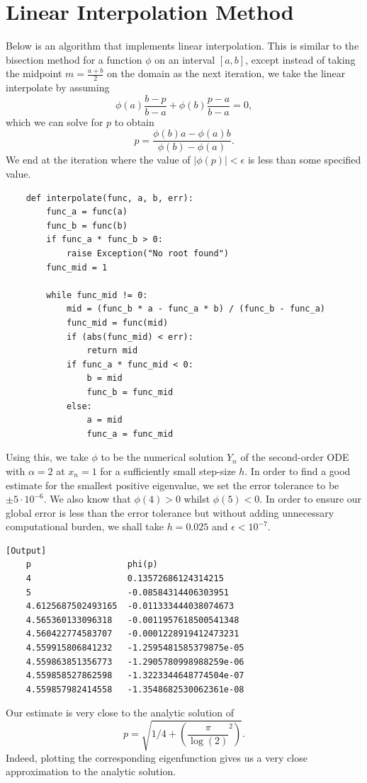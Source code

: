 \documentclass{article}
\begin{document}
\section{Linear Interpolation Method}

Below is an algorithm that implements linear interpolation. This is similar to the bisection method for a function \(\phi\) on an interval \([a, b]\), except instead of taking the midpoint \(m = \frac{a+b}{2}\) on the domain as the next iteration, we take the linear interpolate by assuming
\[ \phi(a)\frac{b - p}{b -a} + \phi(b)\frac{p -a}{b - a} = 0, \]
which we can solve for \(p\) to obtain
\[ p = \frac{\phi(b)a - \phi(a)b}{\phi(b) - \phi(a)}. \]
We end at the iteration where the value of \(|\phi(p)| < \epsilon\) is less than some specified value.

\begin{verbatim}
    def interpolate(func, a, b, err):
        func_a = func(a)
        func_b = func(b)
        if func_a * func_b > 0:
            raise Exception("No root found")
        func_mid = 1
    
        while func_mid != 0:
            mid = (func_b * a - func_a * b) / (func_b - func_a)
            func_mid = func(mid)
            if (abs(func_mid) < err):
                return mid
            if func_a * func_mid < 0:
                b = mid
                func_b = func_mid
            else:
                a = mid
                func_a = func_mid
\end{verbatim}

Using this, we take \(\phi\) to be the numerical solution \(Y_n\) of the second-order ODE with \(\alpha = 2\) at \(x_n = 1\) for a sufficiently small step-size \(h \). In order to find a good estimate for the smallest positive eigenvalue, we set the error tolerance to be \(\pm 5\cdot 10^{-6}\). We also know that \(\phi(4) > 0\) whilst \(\phi(5) < 0\). In order to ensure our global error is less than the error tolerance but without adding unnecessary computational burden, we shall take \(h = 0.025\) and \(\epsilon < 10^{-7}\).

\begin{verbatim}[Output]
    p                   phi(p)
    4                   0.13572686124314215
    5                   -0.08584314406303951
    4.6125687502493165  -0.011333444038074673
    4.565360133096318   -0.0011957618500541348
    4.560422774583707   -0.0001228919412473231
    4.559915806841232   -1.2595481585379875e-05
    4.559863851356773   -1.2905780998988259e-06
    4.559858527862598   -1.3223344648774504e-07
    4.559857982414558   -1.3548682530062361e-08
\end{verbatim}
Our estimate is very close to the analytic solution of 
\[ p = \sqrt{1/4 + \left(\frac{\pi}{\log(2)}^2\right)}.\]
Indeed, plotting the corresponding eigenfunction gives us a very close approximation to the analytic solution.
\end{document}
